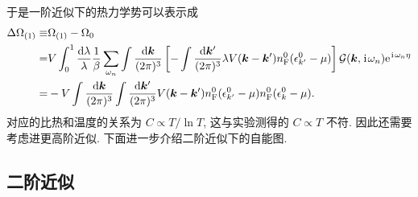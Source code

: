 于是一阶近似下的热力学势可以表示成 
 \begin{align}
        \Delta\Omega_{(1)}\equiv & \Omega_{(1)}-\Omega_0\nonumber\\
        =& V\int_0^1\frac{\mathrm{d}\lambda}{\lambda}\frac{1}{\beta}\sum_{\omega_n}\int\frac{\mathrm{d}\boldsymbol{k}}{(2\pi)^3}\left[ -\int\frac{\mathrm{d}\boldsymbol{k}'}{(2\pi)^3}\lambda V(\boldsymbol{k}-\boldsymbol{k}')n_{\mathrm{F}}^0(\epsilon_{k'}^0-\mu) \right] \mathcal{G}(\boldsymbol{k},\hspace{0.1em}\mathrm{i}\hspace{0.1em}\omega_n)\mathrm{e}^{\hspace{0.1em}\mathrm{i}\hspace{0.1em}\omega_n\eta}\nonumber\\
        =&-V\int\frac{\mathrm{d}\boldsymbol{k}}{(2\pi)^3}\int\frac{\mathrm{d}\boldsymbol{k}'}{(2\pi)^3}V(\boldsymbol{k}-\boldsymbol{k}')n_{\mathrm{F}}^{0}(\epsilon_{k'}^{0}-\mu)n_{\mathrm{F}}^{0}(\epsilon_k^0-\mu).
    \end{align}
对应的比热和温度的关系为 $C\propto T/\ln T$, 这与实验测得的 $C\propto T$ 不符. 因此还需要考虑进更高阶近似. 下面进一步介绍二阶近似下的自能图.

\subsection{二阶近似} 

